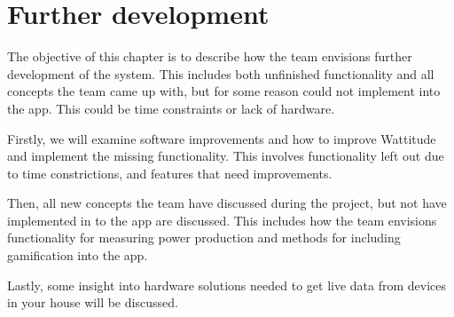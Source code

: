 \chapter{Further development}
\label{sec:further}

The objective of this chapter is to describe how the team envisions further development of the system. This includes both unfinished functionality and all concepts the team came up with, but for some reason could not implement into the app. This could be time constraints or lack of hardware.

Firstly, we will examine software improvements and how to improve Wattitude and implement the missing functionality. This involves functionality left out due to time constrictions, and features that need improvements. 

Then, all new concepts the team have discussed during the project, but not have implemented in to the app are discussed. This includes how the team envisions functionality for measuring power production and methods for including gamification into the app. 

Lastly, some insight into hardware solutions needed to get live data from devices in your house will be discussed. 



